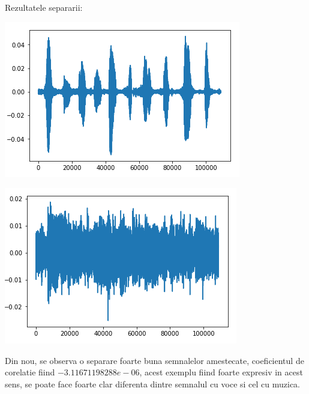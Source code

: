 \documentclass[12pt]{article}
\begin{document}
 Rezultatele separarii:
\begin{center}
	\includegraphics[scale=1]{music_separated_1}
 \end{center}
\begin{center}
	\includegraphics[scale=1]{music_separated_2}
 \end{center}

 Din nou, se observa o separare foarte buna semnalelor amestecate, coeficientul de corelatie fiind $-3.11671198288e-06$, acest exemplu fiind foarte expresiv in acest sens, se poate face foarte clar diferenta dintre semnalul cu voce si cel cu muzica. 
\end{document}
